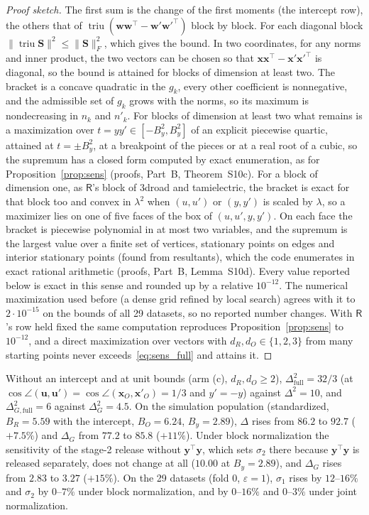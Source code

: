 \documentclass[11pt]{article}
\theoremstyle{definition}
\theoremstyle{plain}
\newcommand{\by}{\mathbf{y}}
\newcommand{\bx}{\mathbf{x}}
\newcommand{\bS}{\mathbf{S}}
\newcommand{\Party}[1]{\textsf{#1}}
\newcommand{\Rp}{\Party{R}}
\DeclareMathOperator{\triu}{triu}
\begin{document}
\begin{proof}[Proof sketch]
The first sum is the change of the first moments (the intercept row), the others that of $\triu(\mathbf w\mathbf w^\top - \mathbf w'\mathbf w'^\top)$ block by block. For each diagonal block $\|\triu \bS\|^2 \le \|\bS\|_F^2$, which gives the bound. In two coordinates, for any norms and inner product, the two vectors can be chosen so that $\mathbf x\mathbf x^\top - \mathbf x'\mathbf x'^\top$ is diagonal, so the bound is attained for blocks of dimension at least two. The bracket is a concave quadratic in the $g_k$, every other coefficient is nonnegative, and the admissible set of $g_k$ grows with the norms, so its maximum is nondecreasing in $n_k$ and $n'_k$. For blocks of dimension at least two what remains is a maximization over $t = yy' \in [-B_y^2, B_y^2]$ of an explicit piecewise quartic, attained at $t = \pm B_y^2$, at a breakpoint of the pieces or at a real root of a cubic, so the supremum has a closed form computed by exact enumeration, as for Proposition~\ref{prop:sens} (proofs, Part~B, Theorem~S10c). For a block of dimension one, as $\Rp$'s block of 3droad and tamielectric, the bracket is exact for that block too and convex in $\lambda^2$ when $(u, u')$ or $(y, y')$ is scaled by $\lambda$, so a maximizer lies on one of five faces of the box of $(u, u', y, y')$. On each face the bracket is piecewise polynomial in at most two variables, and the supremum is the largest value over a finite set of vertices, stationary points on edges and interior stationary points (found from resultants), which the code enumerates in exact rational arithmetic (proofs, Part~B, Lemma~S10d). Every value reported below is exact in this sense and rounded up by a relative $10^{-12}$. The numerical maximization used before (a dense grid refined by local search) agrees with it to $2 \cdot 10^{-15}$ on the bounds of all 29 datasets, so no reported number changes. With $\Rp$'s row held fixed the same computation reproduces Proposition~\ref{prop:sens} to $10^{-12}$, and a direct maximization over vectors with $d_R, d_O \in \{1, 2, 3\}$ from many starting points never exceeds~\eqref{eq:sens_full} and attains it.
\end{proof}

Without an intercept and at unit bounds (arm (c), $d_R, d_O \ge 2$), $\Delta_{\mathrm{full}}^2 = 32/3$ (at $\cos\angle(\mathbf u, \mathbf u') = \cos\angle(\bx_O, \bx'_O) = 1/3$ and $y' = -y$) against $\Delta^2 = 10$, and $\Delta_{G,\mathrm{full}}^2 = 6$ against $\Delta_G^2 = 4.5$. On the simulation population (standardized, $B_R = 5.59$ with the intercept, $B_O = 6.24$, $B_y = 2.89$), $\Delta$ rises from $86.2$ to $92.7$ ($+7.5\%$) and $\Delta_G$ from $77.2$ to $85.8$ ($+11\%$). Under block normalization the sensitivity of the stage-2 release without $\by^\top\by$, which sets $\sigma_2$ there because $\by^\top\by$ is released separately, does not change at all ($10.00$ at $B_y = 2.89$), and $\Delta_G$ rises from $2.83$ to $3.27$ ($+15\%$). On the 29 datasets (fold 0, $\varepsilon = 1$), $\sigma_1$ rises by $12$--$16\%$ and $\sigma_2$ by $0$--$7\%$ under block normalization, and by $0$--$16\%$ and $0$--$3\%$ under joint normalization.
\end{document}
